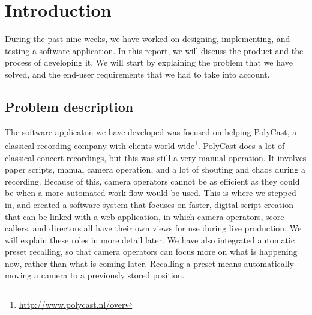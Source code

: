 \section{Introduction}

During the past nine weeks, we have worked on designing, implementing, and testing a software application. In this report, we will discuss the product and the process of developing it. We will start by explaining the problem that we have solved, and the end-user requirements that we had to take into account.

\subsection{Problem description}
The software applicaton we have developed was focused on helping PolyCast, a classical recording company with clients world-wide\footnote{\url{http://www.polycast.nl/over}}. PolyCast does a lot of classical concert recordings, but this was still a very manual operation. It involves paper scripts, manual camera operation, and a lot of shouting and chaos during a recording. Because of this, camera operators cannot be as efficient as they could be when a more automated work flow would be used. This is where we stepped in, and created a software system that focuses on faster, digital script creation that can be linked with a web application, in which camera operators, score callers, and directors all have their own views for use during live production. We will explain these roles in more detail later. We have also integrated automatic preset recalling, so that camera operators can focus more on what is happening now, rather than what is coming later. Recalling a preset means automatically moving a camera to a previously stored position.

